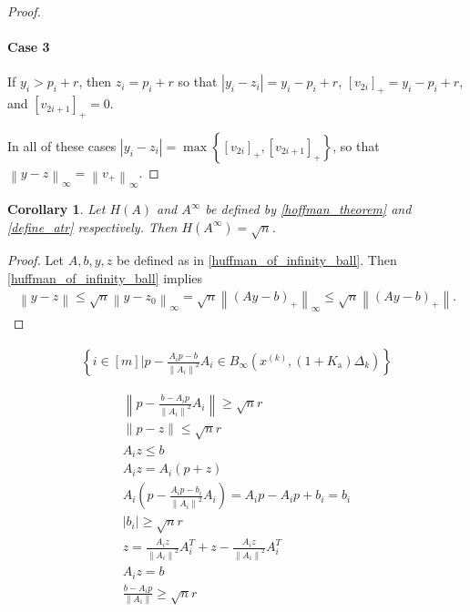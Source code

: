 \documentclass{article}
\newtheorem{corollary}[theorem]{Corollary}
\theoremstyle{case}
\numberwithin{theorem}{subsection}
\newcommand{\atr}{A^{\infty}}
\newcommand{\dk}{\Delta_k}
\newcommand{\xk}{x^{(k)}}
\newcommand{\zikthresh}{{ K_{\textrm{a}} }}
\begin{document}
\begin{proof}
\paragraph{Case 3}
If $y_i > p_i + r              $, then $z_i = p_i + r$ so that $\left|y_i - z_i\right| = y_i - p_i + r$, $\left[v_{2i}\right]_+ = y_i - p_i + r$, and $\left[v_{2i+1}\right]_+ = 0$.

In all of these cases $\left|y_i - z_i\right| = \max\left\{\left[v_{2i}\right]_+, \left[v_{2i+1}\right]_+\right\}$,
so that $\left\|y - z\right\|_{\infty} = \left\| v_+ \right\|_{\infty}$.


\end{proof}

\begin{corollary}
Let $H(A)$ and $\atr$ be defined by \cref{hoffman_theorem} and \cref{define_atr} respectively.
Then $H(\atr) = \sqrt{n}$.
\end{corollary}
\begin{proof}
Let $A, b, y, z$ be defined as in \cref{huffman_of_infinity_ball}.
Then \cref{huffman_of_infinity_ball} implies
\begin{align*}
\left\|y - z\right\|
\le \sqrt{n} \left\|y - z_0\right\|_{\infty}
= \sqrt{n} \left\|\left(Ay - b\right)_+\right\|_{\infty}
\le \sqrt{n} \left\|\left(Ay - b\right)_+\right\|.
\end{align*}
\end{proof}





\begin{align*}
\left\{i \in [m] \bigg| p - \frac{A_ip - b}{\left\|A_i\right\|^2} A_i \in B_{\infty}\left(\xk, (1+\zikthresh)\dk\right)\right\}
\end{align*}



\begin{align*}
\left\|p - \frac{b - A_ip}{\left\|A_i\right\|^2} A_i\right\| \ge \sqrt{n} r \\
\|p - z\| \le \sqrt{n} r \\
A_i z \le b \\
A_i z = A_i(p + z) \\
A_i \left(p - \frac{A_ip - b_i}{\left\|A_i\right\|^2} A_i\right)
= A_i p - A_ip + b_i = b_i \\
|b_i| \ge \sqrt{n} r \\
z = \frac{A_iz}{\left\|A_i\right\|^2}A_i^T + z - \frac{A_iz}{\left\|A_i\right\|^2}A_i^T \\
A_iz = b \\
\frac{b - A_i p}{\|A_i\|} \ge \sqrt{n} r
\end{align*}
\end{document}
